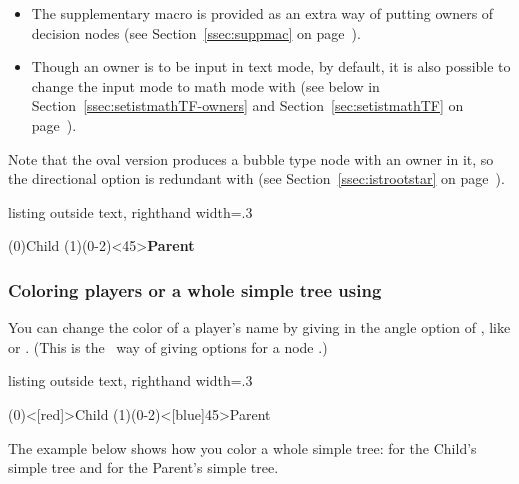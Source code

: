 \remark
\begin{itemize}
\item
The supplementary macro \cmd{\xtOwner} is provided as an extra way of putting owners of decision nodes (see Section~\ref{ssec:suppmac} on page~\pageref{ssec:suppmac}). 
\item
Though an owner is to be input in text mode, by default, it is also possible to change the input mode to math mode with \cmd{\setistmathTF(*)} (see below in Section~\ref{ssec:setistmathTF-owners} and Section~\ref{sec:setistmathTF} on page~\pageref{sec:setistmathTF}).
\end{itemize}

Note that the oval version \cmd{\istrooto} produces a bubble type node with an owner in it, so the directional option  is redundant with \cmd{\istrooto} (see Section~\ref{ssec:istrootstar} on page~\pageref{ssec:istrootstar}).

\begin{tcblisting}{listing outside text, righthand width=.3\linewidth}
\begin{istgame}
\istrooto(0){Child}
  \istb  \istb  \endist
\istrooto(1)(0-2)<45>{\textbf{Parent}}
  \istb  \istb  \endist
\end{istgame}
\end{tcblisting}

\subsubsection{Coloring players or a whole simple tree using \protect\cmd{\istroot}}

\label{sec:firstthing}

You can change the color of a player's name by giving  in the angle option of \cmd{\istroot}, like \xw{<[red]>} or .
(This is the \TikZ\ way of giving options for a node .)

\begin{tcblisting}{listing outside text, righthand width=.3\linewidth}
\begin{istgame}
\istroot(0)<[red]>{Child}
  \istb  
  \istb  
  \endist
\istroot(1)(0-2)<[blue]45>{\textsf{Parent}}
  \istb  
  \istb  
  \endist
\end{istgame}
\end{tcblisting}

The example below shows how you color a whole simple tree:  for the Child's simple tree and  for the Parent's simple tree.


